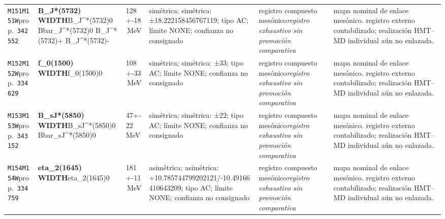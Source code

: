 \begin{landscape}
\begin{longtable}{L{1.85cm}L{4.45cm}L{2.35cm}L{4.05cm}L{3.35cm}L{7.15cm}}
\texttt{M151}\newline \texttt{M151W}\newline prop.\ \texttt{342552} & \textbf{B\_\allowbreak{}J*(5732) WIDTH}\newline B\_\allowbreak{}J\textasciicircum{}*(5732)0 \textbar{}\allowbreak{} Bbar\_\allowbreak{}J\textasciicircum{}*(5732)0 \textbar{}\allowbreak{} B\_\allowbreak{}J\textasciicircum{}*(5732)+ \textbar{}\allowbreak{} B\_\allowbreak{}J\textasciicircum{}*(5732)- & 128+-18\,MeV & simétrica; simétrica: ±18.222158456767119; tipo AC; límite NONE; confianza no consignado & registro compuesto mesónico\newline \emph{registro exhaustivo sin promoción comparativa} & mapa nominal de enlace mesónico. registro externo contabilizado; realización HMT--MD individual aún no enlazada. \\
\texttt{M152}\newline \texttt{M152W}\newline prop.\ \texttt{334629} & \textbf{f\_\allowbreak{}0(1500) WIDTH}\newline f\_\allowbreak{}0(1500)0 & 108+-33\,MeV & simétrica; simétrica: ±33; tipo AC; límite NONE; confianza no consignado & registro compuesto mesónico\newline \emph{registro exhaustivo sin promoción comparativa} & mapa nominal de enlace mesónico. registro externo contabilizado; realización HMT--MD individual aún no enlazada. \\
\texttt{M153}\newline \texttt{M153W}\newline prop.\ \texttt{343152} & \textbf{B\_\allowbreak{}sJ*(5850) WIDTH}\newline B\_\allowbreak{}sJ\textasciicircum{}*(5850)0 \textbar{}\allowbreak{} Bbar\_\allowbreak{}sJ\textasciicircum{}*(5850)0 & 47+-22\,MeV & simétrica; simétrica: ±22; tipo AC; límite NONE; confianza no consignado & registro compuesto mesónico\newline \emph{registro exhaustivo sin promoción comparativa} & mapa nominal de enlace mesónico. registro externo contabilizado; realización HMT--MD individual aún no enlazada. \\
\texttt{M154}\newline \texttt{M154W}\newline prop.\ \texttt{334759} & \textbf{eta\_\allowbreak{}2(1645) WIDTH}\newline eta\_\allowbreak{}2(1645)0 & 181+-11\,MeV & asimétrica; asimétrica: +10.785744799202121/-10.49166410643209; tipo AC; límite NONE; confianza no consignado & registro compuesto mesónico\newline \emph{registro exhaustivo sin promoción comparativa} & mapa nominal de enlace mesónico. registro externo contabilizado; realización HMT--MD individual aún no enlazada. \\

\end{longtable}
\end{landscape}
